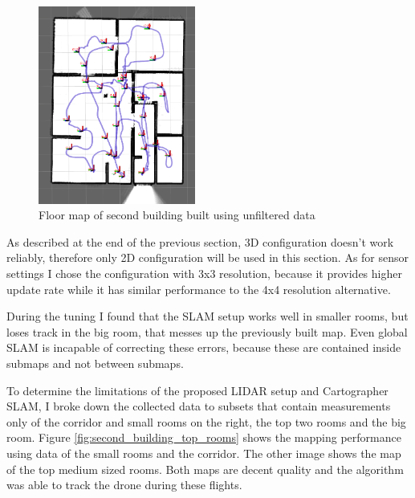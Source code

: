 \begin{figure}[!h]
    \centering
    \includegraphics[height=65mm, keepaspectratio]{figures/building2_floormap.png}
    \caption{Floor map of second building built using unfiltered data}
    \label{fig:second_building_floormap}
\end{figure}

As described at the end of the previous section, 3D configuration doesn't work reliably, therefore only 
2D configuration will be used in this section. As for sensor settings I chose the configuration with 3x3
resolution, because it provides higher update rate while it has similar performance to the 4x4 resolution
alternative.

During the tuning I found that the SLAM setup works well in smaller rooms, but loses track in the big 
room, that messes up the previously built map. Even global SLAM is incapable of correcting these 
errors, because these are contained inside submaps and not between submaps.

To determine the limitations of the proposed LIDAR setup and Cartographer SLAM, I broke down the collected
data to subsets that contain measurements only of the corridor and small rooms on the right, the top two 
rooms and the big room.
Figure \ref{fig:second_building_top_rooms} shows the mapping performance using data of the small rooms 
and the corridor. The other image shows the map of the top medium sized rooms. Both maps are decent quality
and the algorithm was able to track the drone during these flights.


